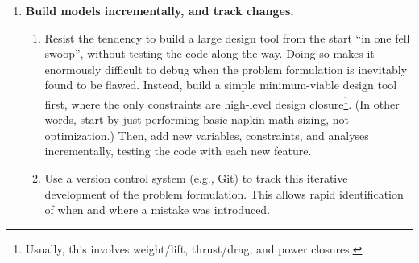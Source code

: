 \begin{enumerate}
    \begin{enumerate}
        \item If a strange solution, error, or indication of infeasibility or unboundedness is reported when this was not expected, this often indicates an error in problem formulation. Most of the time, the error is in the constraints: missing or redundant constraints, erroneous mathematical transcription of design intent, overly tight bounds constraints, etc.
        \item In frameworks using gradient-based optimizers, user-specified models that mathematically violate $C^1$-continuity are another frequent source of non-convergence.
        \item Another common cause of strange results is high-dimensional design problems that optimize around a single operating point \cite{drela_pros_1998}. This can lead to extremely brittle designs that ostensibly perform well in a narrow region around the design point but poorly elsewhere (and in practice).
        \item If initial guesses or problem scales are off by many orders of magnitude, this can also cause slow convergence\footnote{However, typically these factors will not affect the value of the optimum, if it is found. This is true if a) an optimizer like IPOPT is used, which only terminates when KKT-like local optimality conditions are satisfied, and b) the problem is not multimodal enough that convergence to a different local minimum is a concern.}. Strong nonconvexities (e.g., a model interpolating noisy data) can also cause problems.
    \end{enumerate}
    \item \textbf{Build models incrementally, and track changes.}
    \begin{enumerate}
        \item Resist the tendency to build a large design tool from the start ``in one fell swoop'', without testing the code along the way. Doing so makes it enormously difficult to debug when the problem formulation is inevitably found to be flawed. Instead, build a simple minimum-viable design tool first, where the only constraints are high-level design closure\footnote{Usually, this involves weight/lift, thrust/drag, and power closures.}. (In other words, start by just performing basic napkin-math sizing, not optimization.) Then, add new variables, constraints, and analyses incrementally, testing the code with each new feature.
        \item Use a version control system (e.g., Git) to track this iterative development of the problem formulation. This allows rapid identification of when and where a mistake was introduced.

\end{enumerate}
\end{enumerate}
